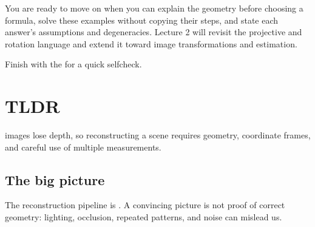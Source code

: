 \documentclass[letterpaper,11pt,english,openany,oneside]{jupyterBook}
\begin{document}
\sphinxAtStartPar
You are ready to move on when you can explain the geometry before choosing a formula, solve these examples without copying their steps, and state each answer’s assumptions and degeneracies. Lecture 2 will revisit the projective and rotation language and extend it toward image transformations and estimation.

\sphinxAtStartPar
Finish with the {\hyperref[\detokenize{lectures/lecture01/tldr::doc}]{}} for a quick self\sphinxhyphen{}check.

\sphinxstepscope


\section{TLDR}
\label{\detokenize{lectures/lecture01/tldr:tldr}}\label{\detokenize{lectures/lecture01/tldr:lec01-tldr}}\label{\detokenize{lectures/lecture01/tldr::doc}}
\sphinxAtStartPar
{} images lose depth, so reconstructing a scene requires geometry, coordinate frames, and careful use of multiple measurements.


\subsection{The big picture}
\label{\detokenize{lectures/lecture01/tldr:the-big-picture}}
\sphinxAtStartPar
The reconstruction pipeline is . A convincing picture is not proof of correct geometry: lighting, occlusion, repeated patterns, and noise can mislead us.
\end{document}
